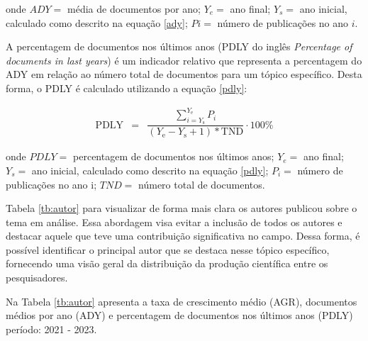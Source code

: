 \noindent onde $ADY =$ média de documentos por ano; $Y_e =$ ano final; $Y_s =$ ano inicial, calculado como descrito na equação \eqref{ady}; $Pi =$ número de publicações no ano $i$.

A percentagem de documentos nos últimos anos (PDLY do inglês \textit{Percentage of documents in last years}) é um indicador relativo que representa a percentagem do ADY em relação ao número total de documentos para um tópico específico. Desta forma, o PDLY é calculado utilizando a equação \eqref{pdly}:

\begin{eqnarray}
	\mathrm{PDLY}&=&\dfrac{\sum_{i=Y_{\mathrm{s}}}^{Y_{\mathrm{e}}} P_i}{\left(Y_{\mathrm{e}}-Y_{\mathrm{s}}+1\right) * \mathrm{TND}} \cdot 100 \%\label{pdly}
\end{eqnarray}

\noindent onde $PDLY =$ percentagem de documentos nos últimos anos; $Y_e =$ ano final; $Y_s =$ ano inicial, calculado como descrito na equação \eqref{pdly}; $P_i =$ número de publicações no ano i; $TND =$ número total de documentos.

Tabela \ref{tb:autor} para visualizar de forma mais clara os autores publicou sobre o tema em análise. Essa abordagem visa evitar a inclusão de todos os autores e destacar aquele que teve uma contribuição significativa no campo. Dessa forma, é possível identificar o principal autor que se destaca nesse tópico específico, fornecendo uma visão geral da distribuição da produção científica entre os pesquisadores.

Na Tabela \ref{tb:autor} apresenta a taxa de crescimento médio (AGR), documentos médios por ano (ADY) e percentagem de documentos nos últimos anos (PDLY) período: 2021 - 2023.

